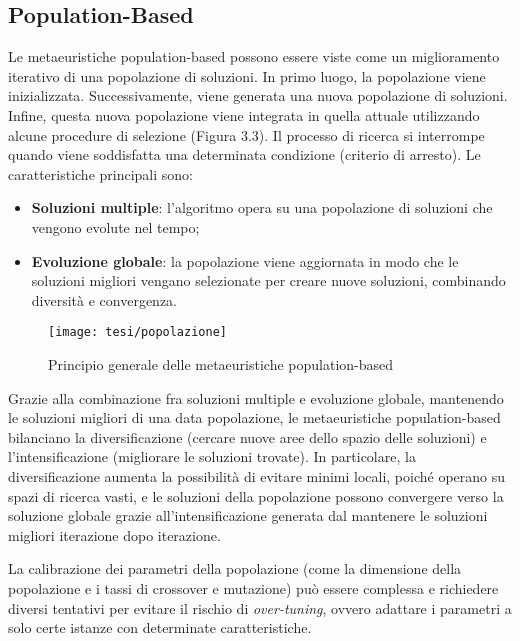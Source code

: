 \subsection{Population-Based} \hypertarget{pb}{}

Le metaeuristiche population-based possono essere viste come un miglioramento iterativo di una popolazione di soluzioni. In primo luogo, la popolazione viene inizializzata. Successivamente, viene generata una nuova popolazione di soluzioni. Infine, questa nuova popolazione viene integrata in quella attuale utilizzando alcune procedure di selezione (Figura 3.3). Il processo di ricerca si interrompe quando viene soddisfatta una determinata condizione (criterio di arresto). %
Le caratteristiche principali sono:
\begin{itemize}
    \item \textbf{Soluzioni multiple}: l'algoritmo opera su una popolazione di soluzioni che vengono evolute nel tempo;
    \item \textbf{Evoluzione globale}: la popolazione viene aggiornata in modo che le soluzioni migliori vengano selezionate per creare nuove soluzioni, combinando diversità e convergenza.
\end{itemize}

\begin{figure}[!ht] 
    \centering 
    \texttt{[image: tesi/popolazione]} 
    \caption{Principio generale delle metaeuristiche population-based}
\end{figure}

Grazie alla combinazione fra soluzioni multiple e evoluzione globale, mantenendo le soluzioni migliori di una data popolazione, le metaeuristiche population-based bilanciano la diversificazione (cercare nuove aree dello spazio delle soluzioni) e l'intensificazione (migliorare le soluzioni trovate). In particolare, la diversificazione aumenta la possibilità di evitare minimi locali, poiché operano su spazi di ricerca vasti, e le soluzioni della popolazione possono convergere verso la soluzione globale grazie all'intensificazione generata dal mantenere le soluzioni migliori iterazione dopo iterazione.

La calibrazione dei parametri della popolazione (come la dimensione della popolazione e i tassi di crossover e mutazione) può essere complessa e richiedere diversi tentativi per evitare il rischio di \emph{over-tuning}\glsfirstoccur, ovvero adattare i parametri a solo certe istanze con determinate caratteristiche.

